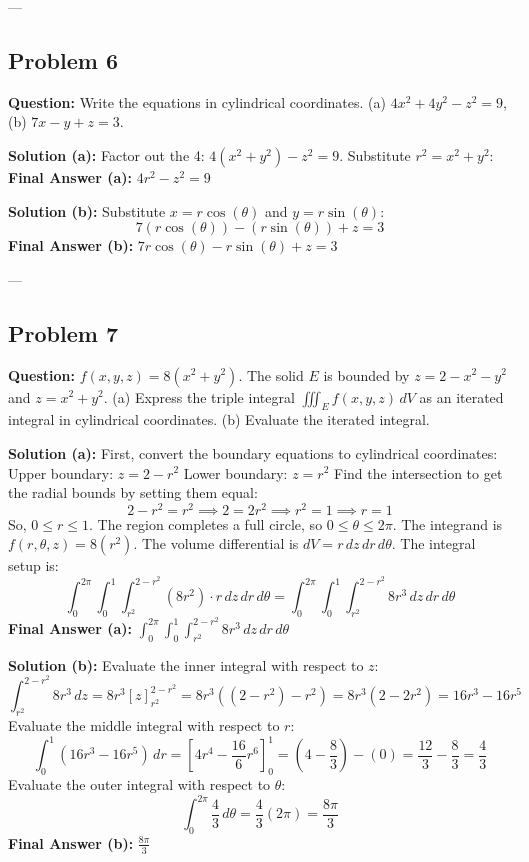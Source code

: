 \documentclass[11pt]{article}
\begin{document}
---

\subsection*{Problem 6}
\textbf{Question:} Write the equations in cylindrical coordinates. (a) $4x^2 + 4y^2 - z^2 = 9$, (b) $7x - y + z = 3$.

\textbf{Solution (a):}
Factor out the 4: $4(x^2 + y^2) - z^2 = 9$.
Substitute $r^2 = x^2 + y^2$:
\textbf{Final Answer (a):} $4r^2 - z^2 = 9$

\textbf{Solution (b):}
Substitute $x = r\cos(\theta)$ and $y = r\sin(\theta)$:
\[ 7(r\cos(\theta)) - (r\sin(\theta)) + z = 3 \]
\textbf{Final Answer (b):} $7r\cos(\theta) - r\sin(\theta) + z = 3$

---

\subsection*{Problem 7}
\textbf{Question:} $f(x, y, z) = 8(x^2 + y^2)$. The solid $E$ is bounded by $z = 2 - x^2 - y^2$ and $z = x^2 + y^2$.
(a) Express the triple integral $\iiint_E f(x, y, z) \, dV$ as an iterated integral in cylindrical coordinates.
(b) Evaluate the iterated integral.

\textbf{Solution (a):}
First, convert the boundary equations to cylindrical coordinates:
Upper boundary: $z = 2 - r^2$
Lower boundary: $z = r^2$
Find the intersection to get the radial bounds by setting them equal:
\[ 2 - r^2 = r^2 \implies 2 = 2r^2 \implies r^2 = 1 \implies r = 1 \]
So, $0 \leq r \leq 1$. The region completes a full circle, so $0 \leq \theta \leq 2\pi$.
The integrand is $f(r, \theta, z) = 8(r^2)$.
The volume differential is $dV = r \, dz \, dr \, d\theta$.
The integral setup is:
\[ \int_{0}^{2\pi} \int_{0}^{1} \int_{r^2}^{2-r^2} (8r^2) \cdot r \, dz \, dr \, d\theta = \int_{0}^{2\pi} \int_{0}^{1} \int_{r^2}^{2-r^2} 8r^3 \, dz \, dr \, d\theta \]
\textbf{Final Answer (a):} $\int_{0}^{2\pi} \int_{0}^{1} \int_{r^2}^{2-r^2} 8r^3 \, dz \, dr \, d\theta$

\textbf{Solution (b):}
Evaluate the inner integral with respect to $z$:
\[ \int_{r^2}^{2-r^2} 8r^3 \, dz = 8r^3 [z]_{r^2}^{2-r^2} = 8r^3 ((2 - r^2) - r^2) = 8r^3(2 - 2r^2) = 16r^3 - 16r^5 \]
Evaluate the middle integral with respect to $r$:
\[ \int_{0}^{1} (16r^3 - 16r^5) \, dr = \left[ 4r^4 - \frac{16}{6}r^6 \right]_{0}^{1} = \left(4 - \frac{8}{3}\right) - (0) = \frac{12}{3} - \frac{8}{3} = \frac{4}{3} \]
Evaluate the outer integral with respect to $\theta$:
\[ \int_{0}^{2\pi} \frac{4}{3} \, d\theta = \frac{4}{3} (2\pi) = \frac{8\pi}{3} \]
\textbf{Final Answer (b):} $\frac{8\pi}{3}$
\end{document}
